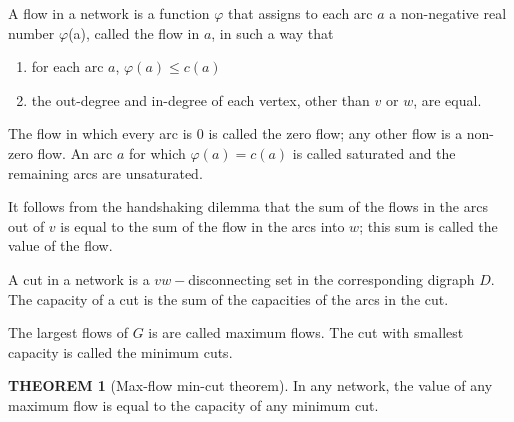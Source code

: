 \documentclass[a4paper,11pt]{article}%
\theoremstyle{remark}
\theoremstyle{definition}
\newtheorem{theorem}{THEOREM}[section]
\theoremstyle{definition}
\theoremstyle{definition}
\theoremstyle{definition}
\theoremstyle{plain}
\theoremstyle{definition}
\begin{document}
A flow in a network is a function $\varphi$ that assigns to each arc $a$ a non-negative real number $\varphi$(a), called the flow in $a$,
in such a way that 
\begin{enumerate}
    \item for each arc $a$, $\varphi(a)\leq c(a)$
    \item the out-degree and in-degree of each vertex, other than $v$ or $w$, are equal.
\end{enumerate}
The flow in which every arc is 0 is called the zero flow; any other flow is a non-zero flow. An arc $a$ for which 
$\varphi(a)=c(a)$ is called saturated and the remaining arcs are unsaturated.

It follows from the handshaking dilemma that the sum of the flows in the arcs out of $v$ is equal to the sum of the flow in the arcs 
into $w$; this sum is called the value of the flow.

A cut in a network is a $vw-$disconnecting set in the corresponding digraph $D$. The capacity of a cut is the sum of the capacities of the 
arcs in the cut. 

The largest flows of $G$ is are called maximum flows. The cut with smallest capacity is called the minimum cuts.
\begin{theorem}[Max-flow min-cut theorem]
   In any network, the value of any maximum flow is equal to the capacity of any minimum cut. 
\end{theorem}
\end{document}
